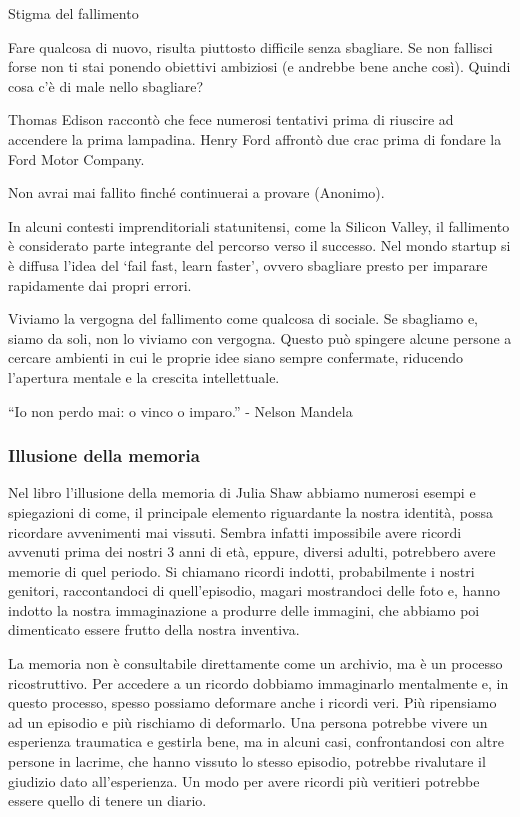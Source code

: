 \documentclass[12pt]{book} %
\begin{document}
\begin{mdframed}[linewidth=1pt]
Stigma del fallimento

Fare qualcosa di nuovo, risulta piuttosto difficile senza sbagliare. Se non fallisci forse non ti stai ponendo obiettivi ambiziosi (e andrebbe bene anche così). Quindi cosa c'è di male nello sbagliare?

Thomas Edison raccontò che fece numerosi tentativi prima di riuscire ad accendere la prima lampadina. Henry Ford affrontò due crac prima di fondare la Ford Motor Company.

Non avrai mai fallito finché continuerai a provare (Anonimo).

In alcuni contesti imprenditoriali statunitensi, come la Silicon Valley, il fallimento è considerato parte integrante del percorso verso il successo. Nel mondo startup si è diffusa l’idea del ‘fail fast, learn faster’, ovvero sbagliare presto per imparare rapidamente dai propri errori.

Viviamo la vergogna del fallimento come qualcosa di sociale. Se sbagliamo e, siamo da soli, non lo viviamo con vergogna. Questo può spingere alcune persone a cercare ambienti in cui le proprie idee siano sempre confermate, riducendo l’apertura mentale e la crescita intellettuale.

“Io non perdo mai: o vinco o imparo.” - Nelson Mandela 
\end{mdframed}

\subsubsection{Illusione della memoria}
Nel libro l'illusione della memoria di Julia Shaw abbiamo numerosi esempi e spiegazioni di come, il principale elemento riguardante la nostra identità, possa ricordare avvenimenti mai vissuti.
Sembra infatti impossibile avere ricordi avvenuti prima dei nostri 3 anni di età, eppure, diversi adulti, potrebbero avere memorie di quel periodo. Si
chiamano ricordi indotti, probabilmente i nostri genitori, raccontandoci di quell'episodio, magari mostrandoci delle foto e, hanno indotto la nostra immaginazione a produrre delle immagini, che abbiamo poi dimenticato essere frutto della nostra inventiva. 

La memoria non è consultabile direttamente come un archivio, ma è un processo ricostruttivo. Per accedere a un ricordo dobbiamo immaginarlo mentalmente e, in questo processo, spesso possiamo deformare anche i ricordi veri. Più ripensiamo ad un episodio e più rischiamo di deformarlo. Una persona potrebbe vivere un esperienza traumatica e gestirla bene, ma in alcuni casi, confrontandosi con altre persone in lacrime, che hanno vissuto lo stesso episodio, potrebbe rivalutare il giudizio dato all'esperienza. Un modo per avere ricordi più veritieri potrebbe essere quello di tenere un diario.
\end{document}
